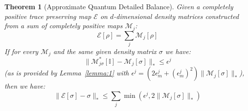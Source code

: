 \documentclass[aps,floatfix,10pt,amssymb,amsfont,amsmath,superscriptaddress,float,nofootinbib,longbibliography,nobalancelastpage,twocolumn]{revtex4-2}
\newtheorem{theorem}{Theorem}
\begin{document}
\begin{theorem}[Approximate Quantum Detailed Balance]
\label{theorem:quantumapproximatedeatildedbalance}
Given a completely positive trace preserving map $\mathcal{E}$ on $d$-dimensional density matrices constructed from a sum of completely positive maps $\mathcal{M}_j$:
\begin{equation}
    \mathcal{E}[\rho] = \sum_j \mathcal{M}_j[\rho]
\end{equation}
If for every $\mathcal{M}_j$ and the same given density matrix $\sigma$ we have:
\begin{equation}
    \|\mathcal{M}^*_{j\sigma}[\mathbb{I}]-\mathcal{M}_{j}[\sigma]\|_* \leq \epsilon^j
\end{equation}
(as is provided by Lemma~\ref{lemma:1} with $\epsilon^j = (2\epsilon^j_m+(\epsilon^j_m)^2)\|\mathcal{M}_j[\sigma]\|_*$), then we have:
\begin{equation}
     \|\mathcal{E}[\sigma]-\sigma\|_* \leq \sum_j\min\left(\epsilon^j, 2\|\mathcal{M}_j[\sigma]\|_*\right)
\end{equation}
\end{theorem}
\end{document}
